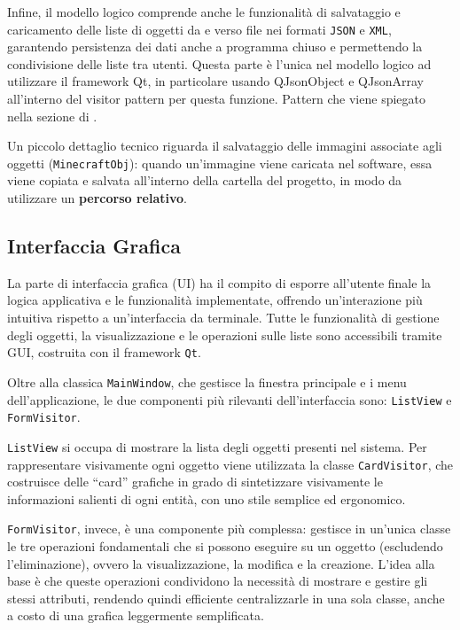 \documentclass[a4paper,12pt]{article}
\begin{document}
Infine, il modello logico comprende anche le funzionalità di salvataggio e caricamento delle liste di oggetti da e verso file nei formati \texttt{JSON} e \texttt{XML}, garantendo persistenza dei dati anche a programma chiuso e permettendo la condivisione delle liste tra utenti.
Questa parte è l'unica nel modello logico ad utilizzare il framework Qt, in particolare usando QJsonObject e QJsonArray all'interno del visitor pattern per questa funzione. Pattern che viene spiegato nella sezione di .

\begin{tcolorbox}[colback=gray!10, colframe=black!80!black, title=Nota Bene]
Un piccolo dettaglio tecnico riguarda il salvataggio delle immagini associate agli oggetti (\texttt{MinecraftObj}):  
quando un'immagine viene caricata nel software, essa viene copiata e salvata all’interno della cartella del progetto, in modo da utilizzare un \textbf{percorso relativo}.  
\end{tcolorbox}

\subsection{Interfaccia Grafica}

La parte di interfaccia grafica (UI) ha il compito di esporre all’utente finale la logica applicativa e le funzionalità implementate, offrendo un’interazione più intuitiva rispetto a un’interfaccia da terminale.  
Tutte le funzionalità di gestione degli oggetti, la visualizzazione e le operazioni sulle liste sono accessibili tramite GUI, costruita con il framework \texttt{Qt}.

Oltre alla classica \texttt{MainWindow}, che gestisce la finestra principale e i menu dell'applicazione, le due componenti più rilevanti dell’interfaccia sono: \texttt{ListView} e \texttt{FormVisitor}.

\texttt{ListView} si occupa di mostrare la lista degli oggetti presenti nel sistema.  
Per rappresentare visivamente ogni oggetto viene utilizzata la classe \texttt{CardVisitor}, che costruisce delle “card” grafiche in grado di sintetizzare visivamente le informazioni salienti di ogni entità, con uno stile semplice ed ergonomico.

\texttt{FormVisitor}, invece, è una componente più complessa: gestisce in un’unica classe le tre operazioni fondamentali che si possono eseguire su un oggetto (escludendo l'eliminazione), ovvero la visualizzazione, la modifica e la creazione.  
L’idea alla base è che queste operazioni condividono la necessità di mostrare e gestire gli stessi attributi, rendendo quindi efficiente centralizzarle in una sola classe, anche a costo di una grafica leggermente semplificata.
\end{document}
